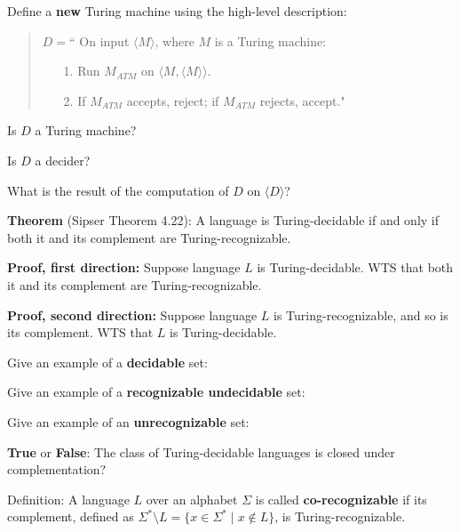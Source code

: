 \documentclass[12pt, oneside]{article}
\begin{document}
Define  a {\bf new} Turing machine using  the high-level description:
\begin{quote}
$D =  $`` On  input $\langle M \rangle$, where  $M$  is  a Turing machine:
\begin{itemize}
\item[1.] Run  $M_{ATM}$ on  $\langle M, \langle M \rangle  \rangle$.
\item[2.] If $M_{ATM}$ accepts, reject; if  $M_{ATM}$ rejects, accept."
\end{itemize}
\end{quote}


Is $D$ a  Turing machine?

\vspace{50pt}

Is  $D$ a  decider? 

\vspace{50pt}

What is the result of the computation  of $D$  on  $\langle D \rangle$?

\vfill

\newpage

{\bf  Theorem} (Sipser Theorem 4.22): A  language is Turing-decidable if and only if both  it and its complement
are Turing-recognizable.

{\bf Proof, first direction:}  Suppose  language  $L$ is  Turing-decidable.   WTS  that both it and its complement 
are Turing-recognizable.

\vfill

{\bf Proof, second direction:}  Suppose  language  $L$ is  Turing-recognizable, and  so is  its complement.   WTS  that $L$
is Turing-decidable.
\vfill


Give an example of a {\bf decidable} set: 

\vspace{20pt}

Give an example of a {\bf recognizable undecidable} set: 

\vspace{20pt}

Give an example of an {\bf unrecognizable} set: 

\vspace{20pt}


\newpage

{\bf True} or {\bf False}: The class of Turing-decidable languages is closed under complementation?

\vfill
\vfill
\vfill
Definition: A language $L$ over an  alphabet $\Sigma$ is called {\bf co-recognizable} if its complement,  defined
as $\Sigma^* \setminus L  = \{ x  \in  \Sigma^* \mid x \notin  L \}$, is Turing-recognizable.
\end{document}
